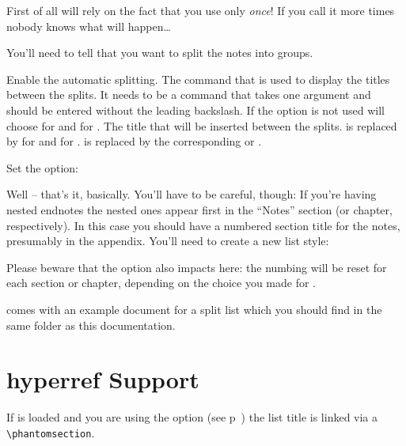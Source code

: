 \documentclass[toc=bib,toc=index]{cnpkgdoc}
\begin{document}
First of all \enotez will rely on the fact that you use 
only \emph{once}! If you call it more times nobody knows what will happen\ldots

You'll need to tell \enotez that you want to split the notes into groups.
\begin{beschreibung}
   Enable the automatic splitting.
 \Default
   The command that is used to display the titles between the splits. It needs
   to be a command that takes one argument and should be entered without the
   leading backslash. If the option is not used \enotez will choose
    for  and  for
   .
   The title that will be inserted between the splits.  is replaced
   by  for  and  for
   .  is replaced by the corresponding
    or .
\end{beschreibung}
Set the  option:
\begin{beispiel}
\end{beispiel}
Well -- that's it, basically. You'll have to be careful, though:
If you're having nested endnotes the nested ones appear first in the ``Notes''
section (or chapter, respectively). In this case you should have a numbered
section title for the notes, presumably in the appendix. You'll need to create
a new list style:
\begin{beispiel}
 \usepackage{enotez}
 \appendix
 \printendnotes
\end{beispiel}

Please beware that the option  also impacts here: the numbing will
be reset for each section or chapter, depending on the choice you made for
.

\enotez comes with an example document for a split list which you should
find in the same folder as this documentation.

\section{hyperref Support}
If  is loaded and you are using the option  (see
p~\pageref{key:totoc}) the list title is linked via a \verb=\phantomsection=.
\end{document}
